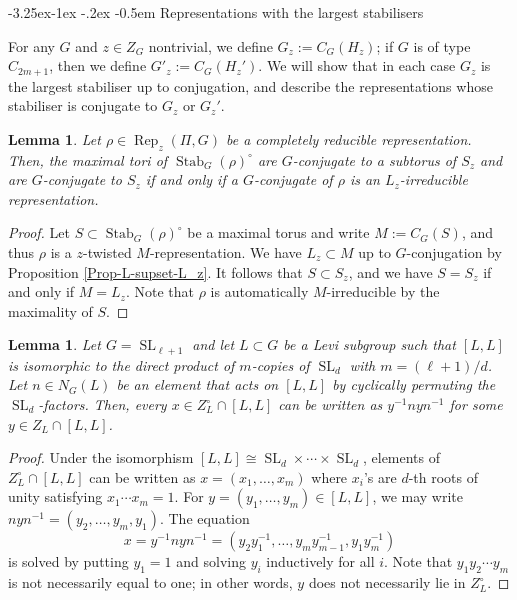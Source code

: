 \documentclass[11pt,oneside,dvipsnames]{amsart}
\makeatletter
\renewcommand\subsection{\@startsection{subsection}{3}{\z@}%
                                     {-3.25ex\@plus -1ex \@minus -.2ex}%
                                     {-0.5em}%
                                     {\normalfont\normalsize\bfseries}}
\theoremstyle{plain}
\newtheorem{Lem}[Thm]{Lemma}
\theoremstyle{definition}
\theoremstyle{named}
\DeclareMathOperator{\Rep}{Rep}
\DeclareMathOperator{\SL}{SL}
\DeclareMathOperator{\Stab}{Stab}
\makeatother
\begin{document}
\subsection{Representations with the largest stabilisers}\label{subsec-large-stab}\hfill

For any $G$ and $z\in Z_G$ nontrivial, we define $G_z:=C_G(H_z)$; if $G$ is of type $C_{2m+1}$, then we define $G'_z:=C_G(H_z')$. We will show that in each case $G_z$ is the largest stabiliser up to conjugation, and describe the representations whose stabiliser is conjugate to $G_z$ or $G_z'$.

\begin{Lem}\label{Lem-Gz-Lz}
Let $\rho\in\Rep_z(\Pi,G)$ be a completely reducible representation. Then, the maximal tori of $\Stab_G(\rho)^{\circ}$ are $G$-conjugate to a subtorus of $S_z$ and are $G$-conjugate to $S_z$ if and only if a $G$-conjugate of $\rho$ is an $L_z$-irreducible representation.
\end{Lem}
\begin{proof}
Let $S\subset \Stab_G(\rho)^{\circ}$ be a maximal torus and write $M:=C_G(S)$, and thus $\rho$ is a $z$-twisted $M$-representation. We have $L_z\subset M$ up to $G$-conjugation by Proposition \ref{Prop-L-supset-L_z}. It follows that $S\subset S_z$, and we have $S=S_z$ if and only if $M=L_z$. Note that $\rho$ is automatically $M$-irreducible by the maximality of $S$.
\end{proof}

\begin{Lem}\label{Lem-SL-L-tau}
Let $G=\SL_{\ell+1}$ and let $L\subset G$ be a Levi subgroup such that $[L,L]$ is isomorphic to the direct product of $m$-copies of $\SL_d$ with $m=(\ell+1)/d$. Let $n\in N_G(L)$ be an element that acts on $[L,L]$ by cyclically permuting the $\SL_d$-factors. Then, every $x\in Z_L^{\circ}\cap[L,L]$ can be written as $y^{-1}nyn^{-1}$ for some $y\in Z_L\cap[L,L]$.
\end{Lem}
\begin{proof}
Under the isomorphism $[L,L]\cong\SL_d\times\cdots\times\SL_d$, elements of $Z_L^{\circ}\cap[L,L]$ can be written as $x=(x_1,\ldots,x_m)$ where $x_i$'s are $d$-th roots of unity satisfying $x_1\cdots x_m=1$. For $y=(y_1,\ldots,y_m)\in[L,L]$, we may write $nyn^{-1}=(y_2,\ldots,y_m,y_1)$. The equation 
$$
x=y^{-1}nyn^{-1}=(y_2y_1^{-1},\ldots,y_my_{m-1}^{-1},y_1y_m^{-1})
$$ 
is solved by putting $y_1=1$ and solving $y_i$ inductively for all $i$. Note that $y_1y_2\cdots y_m$ is not necessarily equal to one; in other words, $y$ does not necessarily lie in $Z_L^{\circ}$.
\end{proof}
\end{document}
